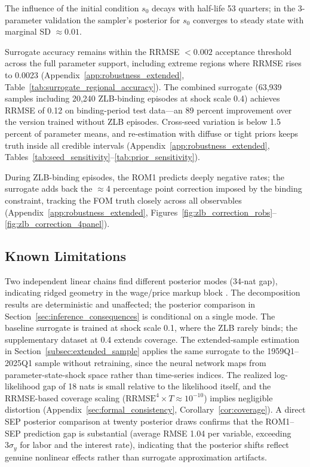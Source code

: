 \documentclass[12pt]{article}
\theoremstyle{plain}
\theoremstyle{definition}
\theoremstyle{remark}
\begin{document}
The influence of the initial condition $s_0$ decays with half-life 53 quarters; in the 3-parameter validation the sampler's posterior for $s_0$ converges to steady state with marginal SD $\approx 0.01$.

Surrogate accuracy remains within the RRMSE $< 0.002$ acceptance threshold across the full parameter support, including extreme regions where RRMSE rises to 0.0023 (Appendix~\ref{app:robustness_extended}, Table~\ref{tab:surrogate_regional_accuracy}). The combined surrogate (63,939 samples including 20,240 ZLB-binding episodes at shock scale 0.4) achieves RRMSE of 0.12 on binding-period test data---an 89 percent improvement over the version trained without ZLB episodes. Cross-seed variation is below 1.5 percent of parameter means, and re-estimation with diffuse or tight priors keeps truth inside all credible intervals (Appendix~\ref{app:robustness_extended}, Tables~\ref{tab:seed_sensitivity}--\ref{tab:prior_sensitivity}).

During ZLB-binding episodes, the ROM1 predicts deeply negative rates; the surrogate adds back the $\approx$4 percentage point correction imposed by the binding constraint, tracking the FOM truth closely across all observables (Appendix~\ref{app:robustness_extended}, Figures~\ref{fig:zlb_correction_robs}--\ref{fig:zlb_correction_4panel}).

\subsection{Known Limitations}
\label{subsec:known_limitations}

Two independent linear chains find different posterior modes (34-nat gap), indicating ridged geometry in the wage/price markup block \citep{herbst2016sequential}. The decomposition results are deterministic and unaffected; the posterior comparison in Section~\ref{sec:inference_consequences} is conditional on a single mode. The baseline surrogate is trained at shock scale 0.1, where the ZLB rarely binds; the supplementary dataset at 0.4 extends coverage. The extended-sample estimation in Section~\ref{subsec:extended_sample} applies the same surrogate to the 1959Q1--2025Q1 sample without retraining, since the neural network maps from parameter-state-shock space rather than time-series indices. The realized log-likelihood gap of 18 nats is small relative to the likelihood itself, and the RRMSE-based coverage scaling ($\text{RRMSE}^4 \times T \approx 10^{-10}$) implies negligible distortion (Appendix~\ref{sec:formal_consistency}, Corollary~\ref{cor:coverage}). A direct SEP posterior comparison at twenty posterior draws confirms that the ROM1--SEP prediction gap is substantial (average RMSE 1.04 per variable, exceeding $3\sigma_y$ for labor and the interest rate), indicating that the posterior shifts reflect genuine nonlinear effects rather than surrogate approximation artifacts.
\end{document}
